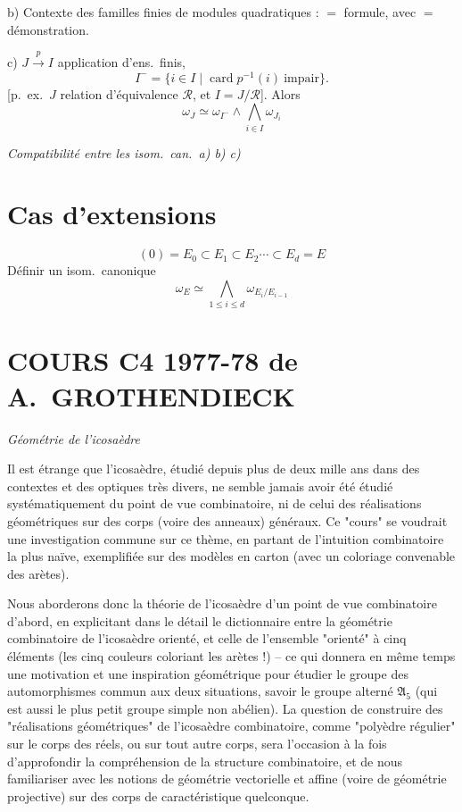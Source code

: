 \documentclass[11pt,a4paper]{article}
\begin{document}
b) Contexte des familles finies de modules quadratiques : $=$ formule, avec $=$
démonstration.

c) $J \xrightarrow{\ p\ } I$ application 
d'ens.\ finis,
\[
  I^- = \{ i \in I \mid \operatorname{card} p^{-1}(i) \ \mathrm{impair} \}.
\]
\struck{\ill{}} [p.\ ex.\ $J$  relation d'équivalence
$\mathcal{R}$, et $I = J/\mathcal{R}$]. Alors
\[
  \omega_J \simeq \omega_{I^-} \wedge \bigwedge_{i \in I} \omega_{J_i}
\]

\textit{Compatibilité entre les isom.\ can.\ a) b) c)}

\section*{Cas d'extensions}

\[
  (0) = E_0 \subset E_1 \subset E_2 \cdots \subset E_d = E
\]
\struck{\ill{}} Définir un isom.\ canonique
\[
  \omega_E \simeq \bigwedge_{1 \leq i \leq d} \omega_{E_i / E_{i-1}}
\]

\section*{COURS C4 1977-78 de A.~GROTHENDIECK}


\textit{Géométrie de l'icosaèdre}

Il est étrange que l'icosaèdre, étudié depuis plus de deux mille ans dans des
contextes et des optiques très divers, ne semble jamais avoir été étudié
systématiquement du point de vue combinatoire, ni de celui des réalisations
géométriques sur des corps (voire des anneaux) généraux. Ce "cours" se voudrait
une investigation commune sur ce thème, en partant de l'intuition combinatoire
la plus naïve, exemplifiée sur des modèles en carton (avec un coloriage
convenable des arètes).

Nous aborderons donc la théorie de l'icosaèdre d'un point de vue combinatoire
d'abord, en explicitant dans le détail le dictionnaire entre la géométrie
combinatoire de l'icosaèdre orienté, et celle de l'ensemble "orienté" à cinq
éléments (les cinq couleurs coloriant les arètes !) -- ce qui donnera en même
temps une motivation et une inspiration géométrique pour étudier le groupe des
automorphismes commun aux deux situations, savoir le groupe alterné
$\mathfrak{A}_5$ (qui est aussi le plus petit groupe simple non abélien). La
question de construire des "réalisations géométriques" de l'icosaèdre
combinatoire, comme "polyèdre régulier" sur le corps des réels, ou sur tout
autre corps, sera l'occasion à la fois d'approfondir la compréhension de la
structure combinatoire, et de nous familiariser avec les notions de géométrie
vectorielle et affine (voire de géométrie projective) sur des corps de
caractéristique quelconque.
\end{document}
